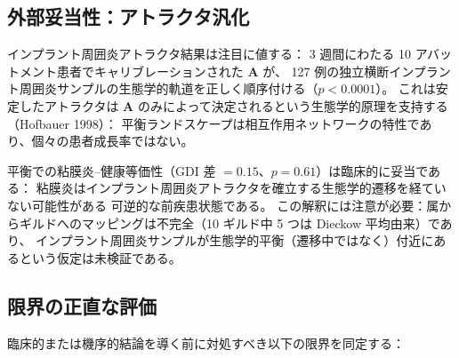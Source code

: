 \documentclass[11pt,a4paper]{article}
\newcommand{\bA}{\mathbf{A}}
\begin{document}
\subsection{外部妥当性：アトラクタ汎化}
\label{ssec:disc_joshi}

インプラント周囲炎アトラクタ結果は注目に値する：
3 週間にわたる 10 アバットメント患者でキャリブレーションされた $\bA$ が、
127 例の独立横断インプラント周囲炎サンプルの生態学的軌道を正しく順序付ける（$p<0.0001$）。
これは安定したアトラクタは $\bA$ のみによって決定されるという生態学的原理を支持する（Hofbauer 1998）：
平衡ランドスケープは相互作用ネットワークの特性であり、個々の患者成長率ではない。

平衡での粘膜炎--健康等価性（GDI 差 $= 0.15$、$p=0.61$）は臨床的に妥当である：
粘膜炎はインプラント周囲炎アトラクタを確立する生態学的遷移を経ていない可能性がある
可逆的な前疾患状態である。
この解釈には注意が必要：属からギルドへのマッピングは不完全（10 ギルド中 5 つは Dieckow 平均由来）であり、
インプラント周囲炎サンプルが生態学的平衡（遷移中ではなく）付近にあるという仮定は未検証である。

\subsection{限界の正直な評価}
\label{ssec:limitations}

臨床的または機序的結論を導く前に対処すべき以下の限界を同定する：
\end{document}
